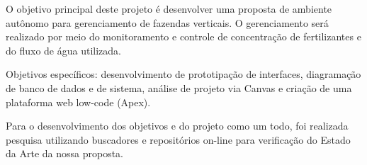 O objetivo principal deste projeto é desenvolver uma proposta de ambiente autônomo para gerenciamento de fazendas verticais. O gerenciamento será realizado por meio do monitoramento e controle de concentração de fertilizantes e do fluxo de água utilizada.

Objetivos específicos: desenvolvimento de prototipação de interfaces, diagramação de banco de dados e de sistema, análise de projeto via Canvas e criação de uma plataforma web low-code (Apex).

Para o desenvolvimento dos objetivos e do projeto como um todo, foi realizada pesquisa utilizando buscadores e repositórios on-line para verificação do Estado da Arte da nossa proposta.